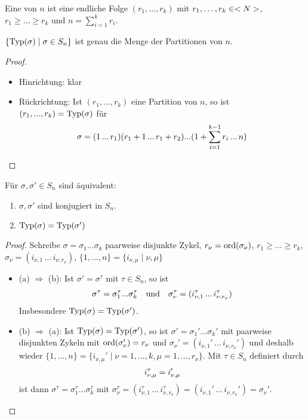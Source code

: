 \begin{definition}[Partition]
	Eine  von $n$ ist eine endliche Folge $(r_1,\dots,r_k)$ mit $r_1,\dots,r_k \in <N>$, $r_1\geq\dots\geq r_k$ und $n = \sum_{i=1}^{k} r_i$.
\end{definition}

\begin{lemma}
	$\{\operatorname{Typ}(\sigma) \mid \sigma \in S_n\}$ ist genau die Menge der Partitionen von $n$.
\end{lemma}
\begin{proof}
	\begin{itemize}
		\item Hinrichtung: klar
		\item Rückrichtung: Ist $(r_1,...,r_k)$ eine Partition von $n$, so ist $(r_1,...,r_k)=\operatorname{Typ}(\sigma)$ für
		\begin{align}
			\sigma = (1\, ...\, r_1)(r_1+1\, ...\, r_1+r_2)...(1+\sum_{i=1}^{k-1}r_i \, ...\, n)\notag
		\end{align}
	\end{itemize}
\end{proof}

\begin{proposition}
	Für $\sigma, \sigma' \in S_n$ sind äquivalent:
	\begin{enumerate}[label=(\alph*)]
		\item $\sigma, \sigma'$ sind konjugiert in $S_n$.
		\item $\operatorname{Typ}(\sigma) = \operatorname{Typ}(\sigma')$
	\end{enumerate}
\end{proposition}
\begin{proof}
	Schreibe $\sigma=\sigma_1...\sigma_k$ paarweise disjunkte Zykel, $r_\nu = \operatorname{ord}(\sigma_\nu)$, $r_1\ge ...\ge r_k$, $\sigma_\nu=(i_{\nu,1}\, ...\, i_{\nu,r_\nu})$, $\{1,...,n\}=\{i_{\nu,\mu} \mid \nu,\mu\}$
	\begin{itemize}
		\item (a) $\Rightarrow$ (b): Ist $\sigma'=\sigma^\tau$ mit $\tau\in S_n$, so ist
		\begin{align}
			\sigma^\tau = \sigma_1^\tau...\sigma_k^\tau \quad\text{und}\quad \sigma_\nu^\tau = (i_{\nu,1}^\tau\, ...\, i_{\nu,r_\nu}^\tau)\notag
		\end{align}
		Insbesondere $\operatorname{Typ}(\sigma)=\operatorname{Typ}(\sigma')$.
		\item (b) $\Rightarrow$ (a): Ist $\operatorname{Typ}(\sigma)=\operatorname{Typ}(\sigma')$, so ist $\sigma'=\sigma_1'...\sigma_k'$ mit paarweise disjunkten Zykeln mit $\operatorname{ord}(\sigma_\nu')=r_\nu$ und $\sigma_\nu'=(i_{\nu,1}'\, ...\, i_{\nu,r_\nu}')$ und deshalb wieder $\{1,...,n\}=\{i_{\nu,\mu}' \mid \nu=1,...,k,\mu=1,...,r_\nu\}$. Mit $\tau\in S_n$ definiert durch 
		\begin{align}
			i_{\nu,\mu}^\tau = i_{\nu,\mu}'\notag
		\end{align}
		ist dann $\sigma^\tau=\sigma_1^\tau...\sigma_k^\tau$ mit $\sigma_\nu^\tau = (i_{\nu,1}^\tau\, ...\, i_{\nu,r_\nu}^\tau)=(i_{\nu,1}'\, ...\, i_{\nu,r_\nu}')=\sigma_\nu'$.
	\end{itemize}
\end{proof}

